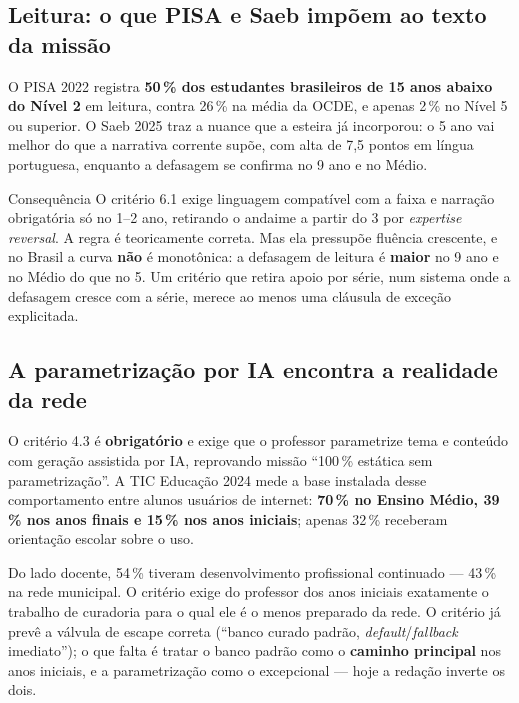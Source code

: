 \documentclass[11pt,a4paper]{article}
\begin{document}
\subsection{Leitura: o que PISA e Saeb imp\~oem ao texto da miss\~ao}

O PISA 2022 \cite{pisa2022} registra \textbf{50\,\% dos estudantes brasileiros de 15 anos abaixo
do N\'ivel 2} em leitura, contra 26\,\% na m\'edia da OCDE, e apenas 2\,\% no N\'ivel 5 ou
superior. O Saeb 2025 \cite{saeb2025} traz a nuance que a esteira j\'a incorporou: o
5\textordmasculine{} ano vai melhor do que a narrativa corrente sup\~oe, com alta de 7,5 pontos em
l\'ingua portuguesa, enquanto a defasagem se confirma no 9\textordmasculine{} ano e no M\'edio.

\begin{notabox}{Consequ\^encia}
O crit\'erio 6.1 exige linguagem compat\'ivel com a faixa e narra\c{c}\~ao obrigat\'oria s\'o no
1\textordmasculine{}--2\textordmasculine{} ano, retirando o andaime a partir do
3\textordmasculine{} por \emph{expertise reversal}. A regra \'e teoricamente correta. Mas ela
pressup\~oe flu\^encia crescente, e no Brasil a curva \textbf{n\~ao} \'e monot\^onica: a
defasagem de leitura \'e \textbf{maior} no 9\textordmasculine{} ano e no M\'edio do que no
5\textordmasculine{}. Um crit\'erio que retira apoio por s\'erie, num sistema onde a defasagem
cresce com a s\'erie, merece ao menos uma cl\'ausula de exce\c{c}\~ao explicitada.
\end{notabox}

\subsection{A parametriza\c{c}\~ao por IA encontra a realidade da rede}

O crit\'erio 4.3 \'e \textbf{obrigat\'orio} e exige que o professor parametrize tema e conte\'udo
com gera\c{c}\~ao assistida por IA, reprovando miss\~ao ``100\,\% est\'atica sem
parametriza\c{c}\~ao''. A TIC Educa\c{c}\~ao 2024 \cite{ticedu2024} mede a base instalada desse
comportamento entre alunos usu\'arios de internet: \textbf{70\,\% no Ensino M\'edio, 39\,\% nos
anos finais e 15\,\% nos anos iniciais}; apenas 32\,\% receberam orienta\c{c}\~ao escolar sobre o
uso.

Do lado docente, 54\,\% tiveram desenvolvimento profissional continuado --- 43\,\% na rede
municipal. O crit\'erio exige do professor dos anos iniciais exatamente o trabalho de curadoria
para o qual ele \'e o menos preparado da rede. O crit\'erio j\'a prev\^e a v\'alvula de escape
correta (``banco curado padr\~ao, \emph{default}/\emph{fallback} imediato''); o que falta \'e
tratar o banco padr\~ao como o \textbf{caminho principal} nos anos iniciais, e a
parametriza\c{c}\~ao como o excepcional --- hoje a reda\c{c}\~ao inverte os dois.
\end{document}
